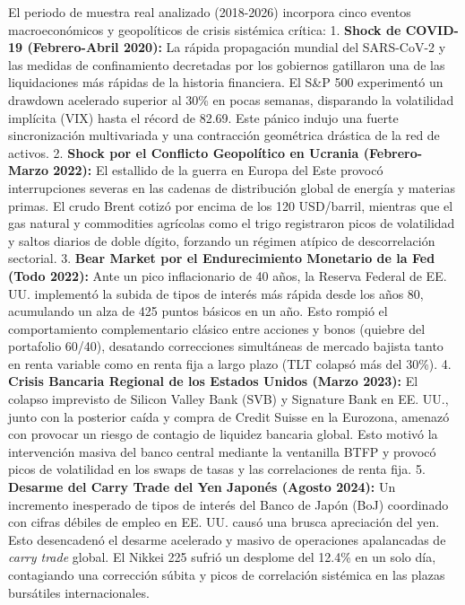 \documentclass[
  12pt,
]{article}
\begin{document}
El periodo de muestra real analizado (2018-2026) incorpora cinco eventos
macroeconómicos y geopolíticos de crisis sistémica crítica: 1.
\textbf{Shock de COVID-19 (Febrero-Abril 2020):} La rápida propagación
mundial del SARS-CoV-2 y las medidas de confinamiento decretadas por los
gobiernos gatillaron una de las liquidaciones más rápidas de la historia
financiera. El S\&P 500 experimentó un drawdown acelerado superior al
30\% en pocas semanas, disparando la volatilidad implícita (VIX) hasta
el récord de 82.69. Este pánico indujo una fuerte sincronización
multivariada y una contracción geométrica drástica de la red de activos.
2. \textbf{Shock por el Conflicto Geopolítico en Ucrania (Febrero-Marzo
2022):} El estallido de la guerra en Europa del Este provocó
interrupciones severas en las cadenas de distribución global de energía
y materias primas. El crudo Brent cotizó por encima de los 120
USD/barril, mientras que el gas natural y commodities agrícolas como el
trigo registraron picos de volatilidad y saltos diarios de doble dígito,
forzando un régimen atípico de descorrelación sectorial. 3. \textbf{Bear
Market por el Endurecimiento Monetario de la Fed (Todo 2022):} Ante un
pico inflacionario de 40 años, la Reserva Federal de EE. UU. implementó
la subida de tipos de interés más rápida desde los años 80, acumulando
un alza de 425 puntos básicos en un año. Esto rompió el comportamiento
complementario clásico entre acciones y bonos (quiebre del portafolio
60/40), desatando correcciones simultáneas de mercado bajista tanto en
renta variable como en renta fija a largo plazo (TLT colapsó más del
30\%). 4. \textbf{Crisis Bancaria Regional de los Estados Unidos (Marzo
2023):} El colapso imprevisto de Silicon Valley Bank (SVB) y Signature
Bank en EE. UU., junto con la posterior caída y compra de Credit Suisse
en la Eurozona, amenazó con provocar un riesgo de contagio de liquidez
bancaria global. Esto motivó la intervención masiva del banco central
mediante la ventanilla BTFP y provocó picos de volatilidad en los swaps
de tasas y las correlaciones de renta fija. 5. \textbf{Desarme del Carry
Trade del Yen Japonés (Agosto 2024):} Un incremento inesperado de tipos
de interés del Banco de Japón (BoJ) coordinado con cifras débiles de
empleo en EE. UU. causó una brusca apreciación del yen. Esto desencadenó
el desarme acelerado y masivo de operaciones apalancadas de \emph{carry
trade} global. El Nikkei 225 sufrió un desplome del 12.4\% en un solo
día, contagiando una corrección súbita y picos de correlación sistémica
en las plazas bursátiles internacionales.
\end{document}
